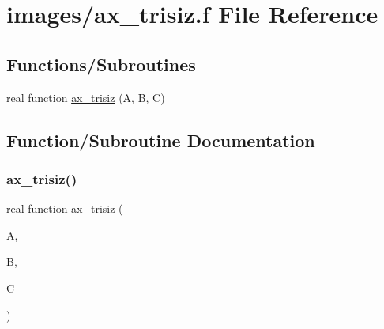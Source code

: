 \hypertarget{ax__trisiz_8f}{}\section{images/ax\+\_\+trisiz.f File Reference}
\label{ax__trisiz_8f}
\subsection*{Functions/\+Subroutines}
\begin{DoxyCompactItemize}
\item 
real function \hyperlink{ax__trisiz_8f_a2aa449c5a500d6e390980fc095a2d19f}{ax\+\_\+trisiz} (A, B, C)
\end{DoxyCompactItemize}


\subsection{Function/\+Subroutine Documentation}
\mbox{\label{ax__trisiz_8f_a2aa449c5a500d6e390980fc095a2d19f}} 
\subsubsection{\texorpdfstring{ax\+\_\+trisiz()}{ax\_trisiz()}}
{\footnotesize\ttfamily real function ax\+\_\+trisiz (\begin{DoxyParamCaption}\item[{}]{A,  }\item[{}]{B,  }\item[{}]{C }\end{DoxyParamCaption})}

